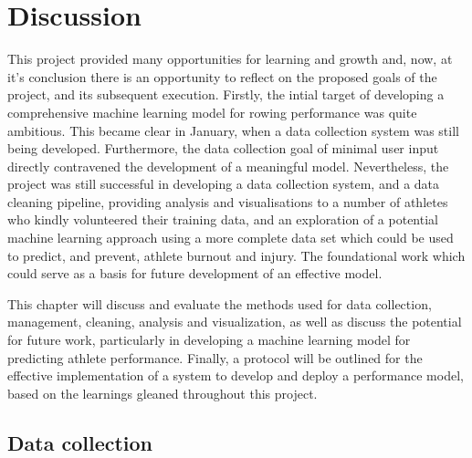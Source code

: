 \chapter{\label{chap:discussion}Discussion}
This project provided many opportunities for learning and growth and, now, at it's conclusion there is an opportunity to reflect on the proposed goals of the project, and its subsequent execution. Firstly, the intial target of developing a comprehensive machine learning model for rowing performance was quite ambitious. This became clear in January, when a data collection system was still being developed. Furthermore, the data collection goal of minimal user input directly contravened the development of a meaningful model. Nevertheless, the project was still successful in developing a data collection system, and a data cleaning pipeline, providing analysis and visualisations to a number of athletes who kindly volunteered their training data, and an exploration of a potential machine learning approach using a more complete data set which could be used to predict, and prevent, athlete burnout and injury. The foundational work which could serve as a basis for future development of an effective model. 

This chapter will discuss and evaluate the methods used for data collection, management, cleaning, analysis and visualization, as well as discuss the potential for future work, particularly in developing a machine learning model for predicting athlete performance. Finally, a protocol will be outlined for the effective implementation of a system to develop and deploy a performance model, based on the learnings gleaned throughout this project.

\section{Data collection}
